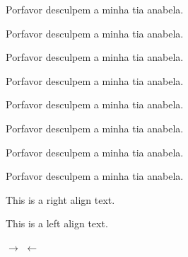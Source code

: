 \documentclass[a4paper,10pt]{article}
\begin{document}
\begin{center}

Porfavor desculpem a minha tia anabela.

\tiny
Porfavor desculpem a minha tia anabela.

\small
Porfavor desculpem a minha tia anabela.

\normalsize
Porfavor desculpem a minha tia anabela.

\large
Porfavor desculpem a minha tia anabela.

\Large
Porfavor desculpem a minha tia anabela.

\huge
Porfavor desculpem a minha tia anabela.

\Huge
Porfavor desculpem a minha tia anabela.

\end{center}

\begin{flushright}

 This is a right align text.
\end{flushright}

\begin{flushleft}
 This is a left align text.
\end{flushleft}



$\rightarrow$
$\leftarrow$
\end{document}

